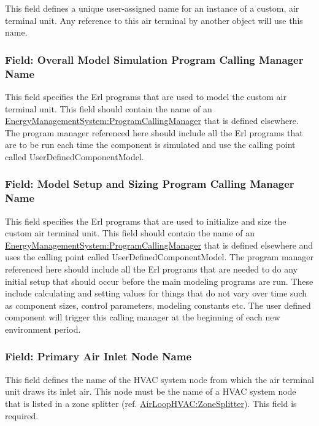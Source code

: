 This field defines a unique user-assigned name for an instance of a custom, air terminal unit. Any reference to this air terminal by another object will use this name.

\subsubsection{Field: Overall Model Simulation Program Calling Manager Name}\label{field-overall-model-simulation-program-calling-manager-name-1}

This field specifies the Erl programs that are used to model the custom air terminal unit. This field should contain the name of an \hyperref[energymanagementsystemprogramcallingmanager]{EnergyManagementSystem:ProgramCallingManager} that is defined elsewhere. The program manager referenced here should include all the Erl programs that are to be run each time the component is simulated and use the calling point called UserDefinedComponentModel.

\subsubsection{Field: Model Setup and Sizing Program Calling Manager Name}\label{field-model-setup-and-sizing-program-calling-manager-name-1}

This field specifies the Erl programs that are used to initialize and size the custom air terminal unit. This field should contain the name of an \hyperref[energymanagementsystemprogramcallingmanager]{EnergyManagementSystem:ProgramCallingManager} that is defined elsewhere and uses the calling point called UserDefinedComponentModel. The program manager referenced here should include all the Erl programs that are needed to do any initial setup that should occur before the main modeling programs are run. These include calculating and setting values for things that do not vary over time such as component sizes, control parameters, modeling constants etc. The user defined component will trigger this calling manager at the beginning of each new environment period.

\subsubsection{Field: Primary Air Inlet Node Name}\label{field-primary-air-inlet-node-name-1-000}

This field defines the name of the HVAC system node from which the air terminal unit draws its inlet air. This node must be the name of a HVAC system node that is listed in a zone splitter (ref. \hyperref[airloophvaczonesplitter]{AirLoopHVAC:ZoneSplitter}). This field is required.

